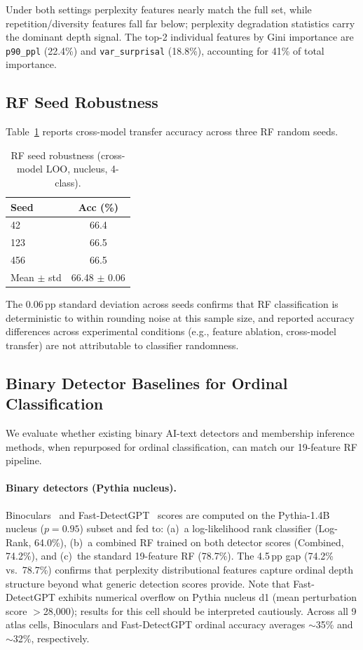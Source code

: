 Under both settings perplexity features nearly match the full set, while repetition/diversity features fall far below; perplexity degradation statistics carry the dominant depth signal.
The top-2 individual features by Gini importance are \texttt{p90\_ppl} (22.4\%) and \texttt{var\_surprisal} (18.8\%), accounting for 41\% of total importance.

\subsection{RF Seed Robustness}
\label{app:rf_seed}

Table~\ref{tab:rf_seed} reports cross-model transfer accuracy across three RF random seeds.

\begin{table}[h]
\centering
\small
\caption{RF seed robustness (cross-model LOO, nucleus, 4-class).}
\label{tab:rf_seed}
\begin{tabular}{@{}lc@{}}
\toprule
Seed & Acc (\%) \\
\midrule
42 & 66.4 \\
123 & 66.5 \\
456 & 66.5 \\
\midrule
Mean $\pm$ std & 66.48 $\pm$ 0.06 \\
\bottomrule
\end{tabular}
\end{table}

The 0.06\,pp standard deviation across seeds confirms that RF classification is deterministic to within rounding noise at this sample size, and reported accuracy differences across experimental conditions (e.g., feature ablation, cross-model transfer) are not attributable to classifier randomness.

\subsection{Binary Detector Baselines for Ordinal Classification}
\label{app:detector_baselines}

We evaluate whether existing binary AI-text detectors and membership inference methods, when repurposed for ordinal classification, can match our 19-feature RF pipeline.

\paragraph{Binary detectors (Pythia nucleus).}
Binoculars~\cite{binoculars2024} and Fast-DetectGPT~\cite{fast_detectgpt2024} scores are computed on the Pythia-1.4B nucleus ($p{=}0.95$) subset and fed to: (a)~a log-likelihood rank classifier (Log-Rank, 64.0\%), (b)~a combined RF trained on both detector scores (Combined, 74.2\%), and (c)~the standard 19-feature RF (78.7\%).
The 4.5\,pp gap (74.2\% vs.\ 78.7\%) confirms that perplexity distributional features capture ordinal depth structure beyond what generic detection scores provide.
Note that Fast-DetectGPT exhibits numerical overflow on Pythia nucleus d1 (mean perturbation score $>$28{,}000); results for this cell should be interpreted cautiously.
Across all 9 atlas cells, Binoculars and Fast-DetectGPT ordinal accuracy averages ${\sim}$35\% and ${\sim}$32\%, respectively.

